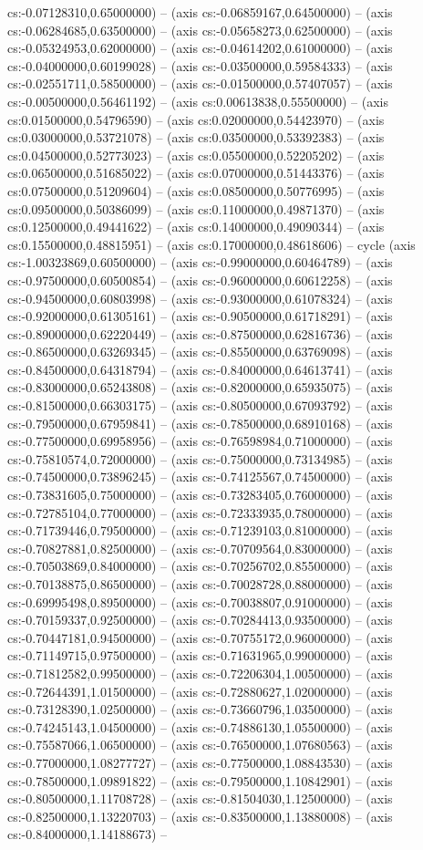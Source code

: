 cs:-0.07128310,0.65000000) -- (axis cs:-0.06859167,0.64500000) -- (axis cs:-0.06284685,0.63500000) -- (axis cs:-0.05658273,0.62500000) -- (axis cs:-0.05324953,0.62000000) -- (axis cs:-0.04614202,0.61000000) -- (axis cs:-0.04000000,0.60199028) -- (axis cs:-0.03500000,0.59584333) -- (axis cs:-0.02551711,0.58500000) -- (axis cs:-0.01500000,0.57407057) -- (axis cs:-0.00500000,0.56461192) -- (axis cs:0.00613838,0.55500000) -- (axis cs:0.01500000,0.54796590) -- (axis cs:0.02000000,0.54423970) -- (axis cs:0.03000000,0.53721078) -- (axis cs:0.03500000,0.53392383) -- (axis cs:0.04500000,0.52773023) -- (axis cs:0.05500000,0.52205202) -- (axis cs:0.06500000,0.51685022) -- (axis cs:0.07000000,0.51443376) -- (axis cs:0.07500000,0.51209604) -- (axis cs:0.08500000,0.50776995) -- (axis cs:0.09500000,0.50386099) -- (axis cs:0.11000000,0.49871370) -- (axis cs:0.12500000,0.49441622) -- (axis cs:0.14000000,0.49090344) -- (axis cs:0.15500000,0.48815951) -- (axis cs:0.17000000,0.48618606) -- cycle (axis cs:-1.00323869,0.60500000) -- (axis cs:-0.99000000,0.60464789) -- (axis cs:-0.97500000,0.60500854) -- (axis cs:-0.96000000,0.60612258) -- (axis cs:-0.94500000,0.60803998) -- (axis cs:-0.93000000,0.61078324) -- (axis cs:-0.92000000,0.61305161) -- (axis cs:-0.90500000,0.61718291) -- (axis cs:-0.89000000,0.62220449) -- (axis cs:-0.87500000,0.62816736) -- (axis cs:-0.86500000,0.63269345) -- (axis cs:-0.85500000,0.63769098) -- (axis cs:-0.84500000,0.64318794) -- (axis cs:-0.84000000,0.64613741) -- (axis cs:-0.83000000,0.65243808) -- (axis cs:-0.82000000,0.65935075) -- (axis cs:-0.81500000,0.66303175) -- (axis cs:-0.80500000,0.67093792) -- (axis cs:-0.79500000,0.67959841) -- (axis cs:-0.78500000,0.68910168) -- (axis cs:-0.77500000,0.69958956) -- (axis cs:-0.76598984,0.71000000) -- (axis cs:-0.75810574,0.72000000) -- (axis cs:-0.75000000,0.73134985) -- (axis cs:-0.74500000,0.73896245) -- (axis cs:-0.74125567,0.74500000) -- (axis cs:-0.73831605,0.75000000) -- (axis cs:-0.73283405,0.76000000) -- (axis cs:-0.72785104,0.77000000) -- (axis cs:-0.72333935,0.78000000) -- (axis cs:-0.71739446,0.79500000) -- (axis cs:-0.71239103,0.81000000) -- (axis cs:-0.70827881,0.82500000) -- (axis cs:-0.70709564,0.83000000) -- (axis cs:-0.70503869,0.84000000) -- (axis cs:-0.70256702,0.85500000) -- (axis cs:-0.70138875,0.86500000) -- (axis cs:-0.70028728,0.88000000) -- (axis cs:-0.69995498,0.89500000) -- (axis cs:-0.70038807,0.91000000) -- (axis cs:-0.70159337,0.92500000) -- (axis cs:-0.70284413,0.93500000) -- (axis cs:-0.70447181,0.94500000) -- (axis cs:-0.70755172,0.96000000) -- (axis cs:-0.71149715,0.97500000) -- (axis cs:-0.71631965,0.99000000) -- (axis cs:-0.71812582,0.99500000) -- (axis cs:-0.72206304,1.00500000) -- (axis cs:-0.72644391,1.01500000) -- (axis cs:-0.72880627,1.02000000) -- (axis cs:-0.73128390,1.02500000) -- (axis cs:-0.73660796,1.03500000) -- (axis cs:-0.74245143,1.04500000) -- (axis cs:-0.74886130,1.05500000) -- (axis cs:-0.75587066,1.06500000) -- (axis cs:-0.76500000,1.07680563) -- (axis cs:-0.77000000,1.08277727) -- (axis cs:-0.77500000,1.08843530) -- (axis cs:-0.78500000,1.09891822) -- (axis cs:-0.79500000,1.10842901) -- (axis cs:-0.80500000,1.11708728) -- (axis cs:-0.81504030,1.12500000) -- (axis cs:-0.82500000,1.13220703) -- (axis cs:-0.83500000,1.13880008) -- (axis cs:-0.84000000,1.14188673) -- 